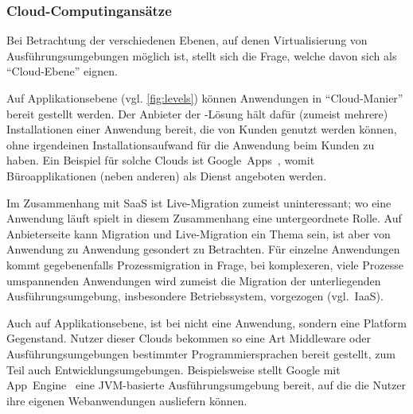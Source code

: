 \subsubsection{Cloud-Computingansätze}


Bei Betrachtung der verschiedenen Ebenen, auf denen Virtualisierung
von Ausführungsumgebungen möglich ist, stellt sich die Frage, welche
davon sich als "`Cloud-Ebene"' eignen.~\cite{Gebhart2010:Virtualization-}
\begin{description}
\item[SaaS] Auf Applikationsebene (vgl. \autoref{fig:levels}) können
  Anwendungen in "`Cloud-Manier"' bereit gestellt werden. Der Anbieter
  der -Lösung hält dafür (zumeist mehrere) Installationen
  einer Anwendung bereit, die von Kunden genutzt werden können, ohne
  irgendeinen Installationsaufwand für die Anwendung beim Kunden zu
  haben. Ein Beispiel für solche Clouds ist
  Google~Apps~\cite{Google-Apps}, womit \zB Büroapplikationen (neben
  anderen) als Dienst angeboten werden.

  Im Zusammenhang mit \ac{SaaS} ist Live-Migration zumeist
  uninteressant; wo eine Anwendung läuft spielt in diesem Zusammenhang
  eine untergeordnete Rolle. Auf Anbieterseite kann Migration und
  Live-Migration ein Thema sein, ist aber von Anwendung zu Anwendung
  gesondert zu Betrachten. Für einzelne Anwendungen kommt
  gegebenenfalls Prozessmigration in Frage, bei komplexeren, viele
  Prozesse umspannenden Anwendungen wird zumeist die Migration der
  unterliegenden Ausführungsumgebung, insbesondere Betriebssystem,
  vorgezogen (vgl.~IaaS).
\item[PaaS] Auch auf Applikationsebene, ist bei  nicht eine
  Anwendung, sondern eine Platform Gegenstand. Nutzer dieser Clouds
  bekommen so eine Art Middleware oder Ausführungsumgebungen
  bestimmter Programmiersprachen bereit gestellt, zum Teil auch
  Entwicklungsumgebungen. Beispielsweise stellt Google mit
  App~Engine~\cite{Google-App-Engi} eine JVM-basierte
  Ausführungsumgebung bereit, auf die die Nutzer ihre eigenen
  Webanwendungen ausliefern können.
  

\end{description}
